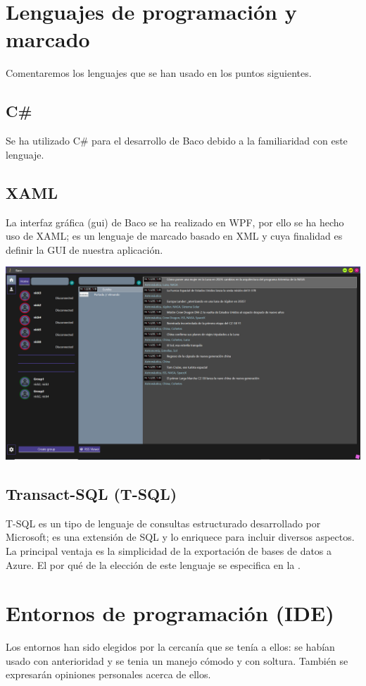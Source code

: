 \documentclass[12pt, a4paper]{book} %
\begin{document}
		\section{Lenguajes de programación y marcado} \label{sc:lenguajes}
		Comentaremos los lenguajes que se han usado en los puntos siguientes.
			\subsection{C\#}
			Se ha utilizado C\# para el desarrollo de Baco debido a la familiaridad con este lenguaje.
			\subsection{XAML}
			La interfaz gráfica (\acrshort{gui}) de Baco se ha realizado en WPF, por ello se ha hecho uso de XAML; es un lenguaje de marcado basado en XML y cuya finalidad es definir la GUI de nuestra aplicación.
			\begin{center}
				\includegraphics[width=\textwidth,height=\textheight, keepaspectratio]{img/DrawIO/src/hub.PNG}\\
			\end{center}
			\subsection{Transact-SQL (T-SQL)}
			T-SQL es un tipo de lenguaje de consultas estructurado desarrollado por Microsoft; es una extensión de SQL y lo enriquece para incluir diversos aspectos. La principal ventaja es la simplicidad de la exportación de bases de datos a Azure. El por qué de la elección de este lenguaje se especifica en la .
		\section{Entornos de programación (IDE)} \label{sc:entornos}
		Los entornos han sido elegidos por la cercanía que se tenía a ellos: se habían usado con anterioridad y se tenia un manejo cómodo y con soltura. También se expresarán opiniones personales acerca de ellos.
\end{document}
